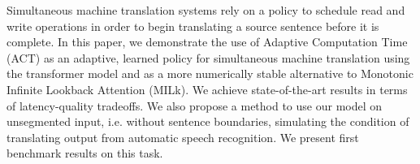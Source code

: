 Simultaneous machine translation systems rely on a policy to schedule read and write operations in order to begin translating a source sentence before it is complete. In this paper, we demonstrate the use of Adaptive Computation Time (ACT) as an adaptive, learned policy for simultaneous machine translation using the transformer model and as a more numerically stable alternative to Monotonic Infinite Lookback Attention (MILk). We achieve state-of-the-art results in terms of latency-quality tradeoffs. We also propose a method to use our model on unsegmented input, i.e. without sentence boundaries, simulating the condition of translating output from automatic speech recognition. We present first benchmark results on this task.
